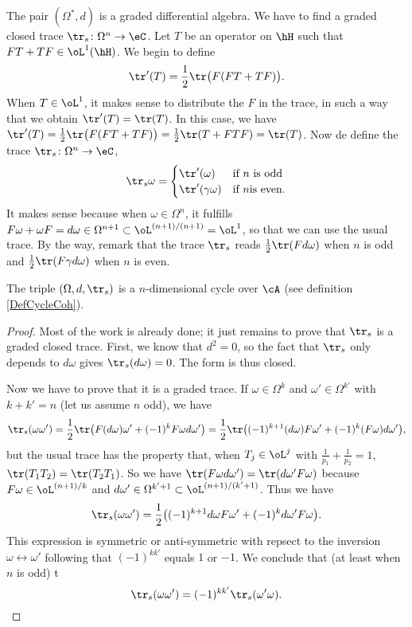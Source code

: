 The pair $(\Omega^*,d)$ is a graded differential algebra. We have to find a graded closed trace $\tr_s\colon \Omega^n\to \eC$. Let $T$ be an operator on $\hH$ such that $FT+TF\in\oL^1(\hH)$. We begin to define
\[ 
  \tr'(T)=\frac{ 1 }{2}\tr\big( F(FT+TF) \big).
\]
When $T\in\oL^1$, it makes sense to distribute the $F$ in the trace, in such a way that we obtain $\tr'(T)=\tr(T)$. In this case, we have
  $\tr'(T)=\frac{ 1 }{2}\tr\big( F(FT+TF) \big)=\frac{ 1 }{2}\tr(T+FTF)=\tr(T)$.
Now de define the trace $\tr_s\colon \Omega^n\to \eC$,
\[ 
  \tr_s\omega=
\begin{cases}
    \tr'(\omega)&\text{if }n \text{ is odd}\\
    \tr'(\gamma\omega)&\text{if }n \text{is even}.
\end{cases}
\]
It makes sense because when $\omega\in\Omega^n$, it fulfills $F\omega+\omega F=d\omega\in\Omega^{n+1}\subset\oL^{(n+1)/(n+1)}=\oL^1$, so that we can use the usual trace. By the way, remark that the trace $\tr_s$ reads $\frac{ 1 }{2}\tr(Fd\omega)$ when $n$ is odd and $\frac{ 1 }{2}\tr(F\gamma d\omega)$ when $n$ is even.

\begin{proposition}
	The triple $(\Omega,d,\tr_s)$ is a $n$-dimensional cycle over  $\cA$ (see definition \ref{DefCycleCoh}).
\end{proposition}

\begin{proof}
Most of the work is already done; it just remains to prove that $\tr_s$ is a graded closed trace. First, we know that $d^2=0$, so the fact that $\tr_s$ only depends to $d\omega$ gives $\tr_s(d\omega)=0$. The form is thus closed.

Now we have to prove that it is a graded trace. If $\omega\in\Omega^k$ and $\omega'\in\Omega^{k'}$ with $k+k'=n$ (let us assume $n$ odd), we have
\[ 
  \tr_s(\omega\omega')=\frac{ 1 }{2}\tr\big( F(d\omega)\omega'+(-1)^{k}F\omega d\omega' \big)=\frac{ 1 }{2}\tr\big( (-1)^{k+1}(d\omega)F\omega'+(-1)^k(F\omega)d\omega' \big),
\]
but the usual trace has the property that, when $T_j\in\oL^j$ with $\frac{1}{ p_1 }+\frac{1}{ p_2 }=1$, $\tr(T_1T_2)=\tr(T_2T_1)$. So we have $\tr(F\omega d\omega')=\tr(d\omega'F\omega)$ because $F\omega\in\oL^{(n+1)/  k }$ and $d\omega'\in\Omega^{k'+1}\subset\oL^{(n+1)/(k'+1)}$. Thus we have
\[ 
  \tr_s(\omega\omega')=\frac{ 1 }{2}\big( (-1)^{k+1}d\omega F\omega'+(-1)^kd\omega' F\omega \big).
\]
This expression is symmetric or anti-symmetric with repsect to the inversion $\omega\leftrightarrow\omega'$ following that $(-1)^{kk'}$ equals $1$ or $-1$. We conclude that (at least when $n$ is odd) t
\[ 
  \tr_s(\omega\omega')=(-1)^{kk'}\tr_s(\omega'\omega).
\]
\end{proof}

